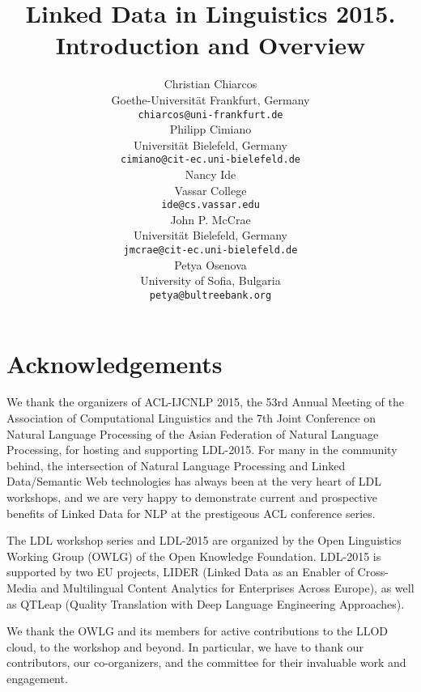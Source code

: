 \documentclass[11pt]{article}
\title{Linked Data in Linguistics 2015. Introduction and Overview}
\author{Christian Chiarcos \\
  Goethe-Universität Frankfurt, Germany\\
  {\tt chiarcos@uni-frankfurt.de} \\
  \And 
  Philipp Cimiano\\
  Universität Bielefeld, Germany\\
  {\tt cimiano@cit-ec.uni-bielefeld.de}\\ 
  \And
  Nancy Ide\\
  Vassar College\\
  {\tt ide@cs.vassar.edu}\\
  \And
  John P. McCrae \\
  Universität Bielefeld, Germany\\
  {\tt jmcrae@cit-ec.uni-bielefeld.de}\\ 
  \And
  Petya Osenova\\
  University of Sofia, Bulgaria\\
  {\tt petya@bultreebank.org}
}
\date{}
\begin{document}
\maketitle






\section*{Acknowledgements}

We thank the organizers of ACL-IJCNLP 2015, the 53rd Annual Meeting of the Association of Computational Linguistics and the 7th Joint Conference on Natural Language Processing of the Asian Federation of Natural Language Processing, for hosting and supporting LDL-2015. 
For many in the community behind, the intersection of Natural Language Processing and Linked Data/Semantic Web technologies has always been at the very heart of LDL workshops, and we are very happy to demonstrate current and prospective benefits of Linked Data for NLP at the prestigeous ACL conference series.

The LDL workshop series and LDL-2015 are organized by the Open Linguistics Working Group (OWLG) of the Open Knowledge Foundation. LDL-2015 is supported by two EU projects, LIDER (Linked Data as an Enabler of Cross-Media and Multilingual Content Analytics for Enterprises Across Europe), as well as QTLeap (Quality Translation with Deep Language Engineering Approaches).

We thank the OWLG and its members for active contributions to the LLOD cloud, to the workshop and beyond. In particular, we have to thank our contributors, our co-organizers, and the committee for their invaluable work and engagement. 




\newpage
\end{document}
